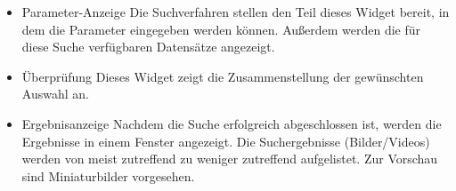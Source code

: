 \begin{itemize}
\item Parameter-Anzeige \newline
Die Suchverfahren stellen den Teil dieses \gls{Widget} bereit, in dem die Parameter eingegeben werden können. Außerdem werden die für diese Suche verfügbaren Datensätze angezeigt.

\item Überprüfung \newline 
Dieses \gls{Widget} zeigt die Zusammenstellung der gewünschten Auswahl an.

\item Ergebnisanzeige \newline
Nachdem die Suche erfolgreich abgeschlossen ist, werden die Ergebnisse in einem Fenster angezeigt. Die Suchergebnisse (Bilder/Videos) werden von meist zutreffend zu weniger zutreffend aufgelistet. Zur Vorschau sind Miniaturbilder vorgesehen.

\end{itemize}
